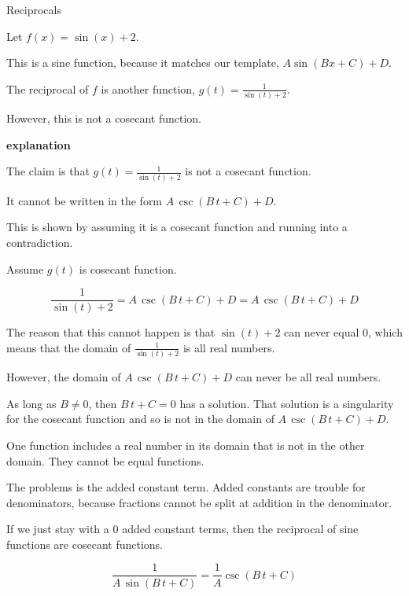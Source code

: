\documentclass{ximera}
\begin{document}
\begin{example} Reciprocals


Let $f(x) = \sin(x) + 2$.

This is a sine function, because it matches our template, $A \sin(B x + C) + D$.

The reciprocal of $f$ is another function, $g(t) = \frac{1}{\sin(t) + 2}$.

However, this is not a cosecant function.

\textbf{\textcolor{red!75!green}{explanation}} 


The claim is that $g(t) = \frac{1}{\sin(t) + 2}$ is not a cosecant function.

It cannot be written in the form $A \, \csc(B \, t + C) + D$.


This is shown by assuming it is a cosecant function and running into a contradiction.


Assume $g(t)$ is cosecant function.


\[
\frac{1}{\sin(t) + 2} = A \, \csc(B \, t + C) + D = A \, \csc(B \, t + C) + D
\]


The reason that this cannot happen is that $\sin(t) + 2$ can never equal $0$, which means that the domain of $\frac{1}{\sin(t) + 2}$ is all real numbers.

However, the domain of $A \, \csc(B \, t + C) + D$ can never be all real numbers.


As long as $B \ne 0$, then $B \, t + C = 0$ has a solution.  That solution is a singularity for the cosecant function and so is not in the domain of $A \, \csc(B \, t + C) + D$.

One function includes a real number in its domain that is not in the other domain.  They cannot be equal functions.




\end{example}

The problems is the added constant term.  Added constants are trouble for denominators, because fractions cannot be split at addition in the denominator.




If we just stay with a $0$ added constant terms, then the reciprocal of sine functions are cosecant functions.



\[
\frac{1}{A \, \sin(B \, t + C)} = \frac{1}{A} \csc(B \, t + C) 
\]
\end{document}
